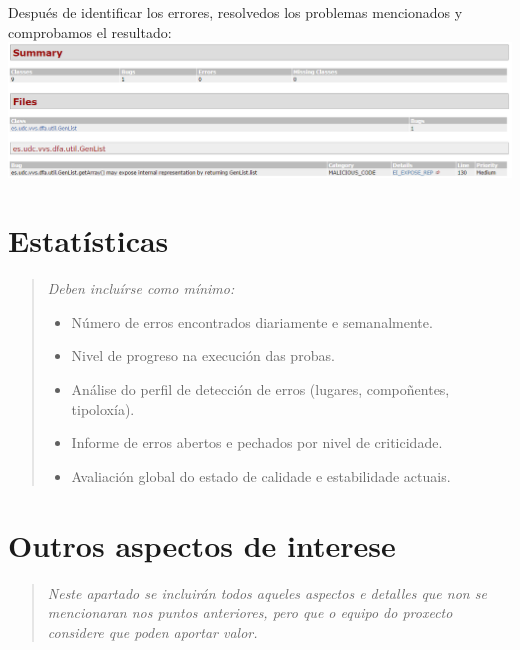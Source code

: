 \documentclass[DIV=calc,paper=a4,fontsize=11pt,onecolumn]{scrartcl} %
\newcommand{\hint}[1]{\begin{quote}\itshape #1 \end{quote}}
\begin{document}
	Después de identificar los errores, resolvedos los problemas mencionados y comprobamos el resultado:\\
	
	\includegraphics[width=15cm]{Imagenes/findBugs2.png} \\

\section{Estatísticas}

\hint{Deben incluírse como mínimo:
  \begin{itemize}
    \item Número de erros encontrados diariamente e semanalmente.
    \item Nivel de progreso na execución das probas.
    \item Análise do perfil de detección de erros (lugares, compoñentes, tipoloxía).
    \item Informe de erros abertos e pechados por nivel de criticidade.
    \item Avaliación global do estado de calidade e estabilidade actuais.
  \end{itemize}}

\section{Outros aspectos de interese}

\hint{Neste apartado se incluirán todos aqueles aspectos e detalles que non se
  mencionaran nos puntos anteriores, pero que o equipo do proxecto considere que
  poden aportar valor.}
\end{document}
